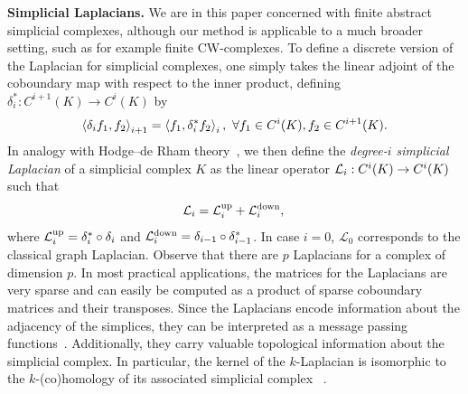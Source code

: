\textbf{Simplicial Laplacians.} We are in this paper concerned with finite abstract simplicial complexes, although our method is applicable to a much broader setting, such as for example finite CW-complexes. 
To define a discrete version of the Laplacian for simplicial complexes, one simply takes the linear adjoint of the coboundary map with respect to the inner product, defining $\delta_i^\ast:C^{i+1}(K)\to C^i(K)$ by
\begin{equation*}
  \left\langle \delta_i f_1 , f_2 \right\rangle_{i+1} =\left\langle f_1 , \delta_i^\ast f_2 \right\rangle_{i},\ \forall f_1\in C^{i}(K), f_2 \in C^{i+1}(K).
\end{equation*}
In analogy with Hodge--de Rham theory~\cite{madsen1997calculus}, we then define the \emph{degree-$i$ simplicial Laplacian} of a simplicial complex $K$ as the linear operator $\mathcal{L}_i:C^i(K)\to C^i(K)$ such that
\begin{equation*}
  \mathcal{L}_i = \mathcal{L}^{\text{up}}_i + \mathcal{L}^{\text{down}}_i,\\
\end{equation*}
where $\mathcal{L}^{\text{up}}_i =  \delta_{i}^\ast\circ\delta_{i}$ and $\mathcal{L}^{\text{down}}_i = \delta_{i-1}\circ\delta_{i-1}^\ast$. In case $i=0$, $\mathcal{L}_0$ corresponds to the classical graph Laplacian. Observe that there are $p$ Laplacians for a complex of dimension $p$. In most practical applications, the matrices for the Laplacians are very sparse and can easily be computed as a product of sparse coboundary matrices and their transposes. Since the Laplacians encode information about the adjacency of the simplices, they can be interpreted as a message passing functions~\cite{gilmer2017NeuralMP}. Additionally, they carry valuable topological information about the simplicial complex. In particular, the kernel of the $k$-Laplacian is isomorphic to the $k$-(co)homology of its associated simplicial complex ~\cite{eckmann1944,horak2013spectra}.
